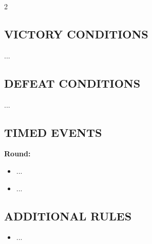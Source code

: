 \begin{multicols*}{2}
\subsection*{\MakeUppercase{Victory Conditions}}
...

\subsection*{\MakeUppercase{Defeat Conditions}}
...

\subsection*{\MakeUppercase{Timed Events}}

\textbf{ Round:}
\begin{itemize}
  \item ...
  \item ...
\end{itemize}

%
%
%

\subsection*{\MakeUppercase{Additional Rules}}

\begin{itemize}
    \item ...
\end{itemize}

\end{multicols*}


